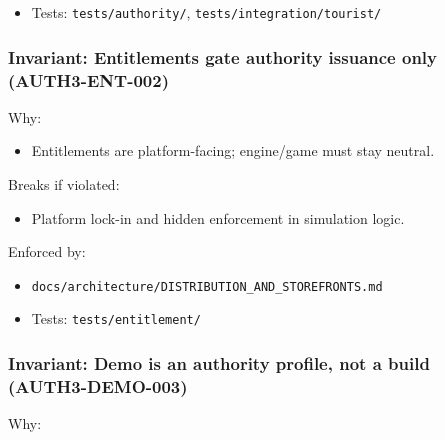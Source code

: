 \documentclass[9pt,a4paper,openany]{book}
\begin{document}
\begin{itemize}
\item Tests: \texttt{tests/\allowbreak{}authority/\allowbreak{}}, \texttt{tests/\allowbreak{}integration/\allowbreak{}tourist/\allowbreak{}}
\end{itemize}





\subsubsection{Invariant: Entitlements gate authority issuance only (AUTH3-ENT-002)}


Why:



\begin{itemize}
\item Entitlements are platform-\allowbreak{}facing; engine/\allowbreak{}game must stay neutral.\allowbreak{}
\end{itemize}


Breaks if violated:



\begin{itemize}
\item Platform lock-\allowbreak{}in and hidden enforcement in simulation logic.\allowbreak{}
\end{itemize}


Enforced by:



\begin{itemize}
\item \texttt{docs/\allowbreak{}architecture/\allowbreak{}DISTRIBUTION\_\allowbreak{}AND\_\allowbreak{}STOREFRONTS.\allowbreak{}md}
\end{itemize}


\begin{itemize}
\item Tests: \texttt{tests/\allowbreak{}entitlement/\allowbreak{}}
\end{itemize}





\subsubsection{Invariant: Demo is an authority profile, not a build (AUTH3-DEMO-003)}


Why:
\end{document}
